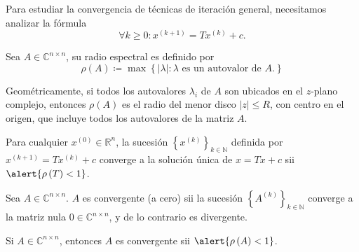 \begin{frame}

	Para estudiar la convergencia de técnicas de iteración general,
	necesitamos analizar la fórmula
	\begin{equation*}
		\boxed{
			\forall k\geq0:
			x^{\left(k+1\right)}=
			Tx^{\left(k\right)}+c.
		}
	\end{equation*}

	\begin{definition}
		Sea $A\in\mathbb{C}^{n\times n}$, su \alert{radio espectral} es
		definido por
		\begin{equation*}
			\rho\left(A\right)\coloneqq
			\max
			\left\{
			\left|\lambda\right|\colon
			\lambda\text{ es un autovalor de }A.
			\right\}
		\end{equation*}

		Geométricamente, si todos los autovalores $\lambda_{i}$ de $A$
		son ubicados en el $z$-plano complejo, entonces
		$\rho\left(A\right)$ es el radio del menor disco
		$\left|z\right|\leq R$, con centro en el origen, que incluye
		todos los autovalores de la matriz $A$.
	\end{definition}

	\begin{theorem}
		Para cualquier $x^{\left(0\right)}\in\mathbb{R}^{n}$, la sucesión
		\begin{math}
			{\left\{x^{\left(k\right)}\right\}}_{k\in\mathbb{N}}
		\end{math}
		definida por
		\begin{math}
			x^{\left(k+1\right)}=
			Tx^{\left(k\right)}+
			c
		\end{math}
		converge a la \alert{solución única} de $x=Tx+c$ sii
		\begin{math}
			\alert{
				\rho\left(T\right)<
				1
			}
		\end{math}.
	\end{theorem}

	\begin{definition}
		Sea $A\in\mathbb{C}^{n\times n}$.
		$A$ es \alert{convergente}
		(\alert{a cero}) sii la sucesión
		\begin{math}
			{\left\{A^{\left(k\right)}\right\}}_{k\in\mathbb{N}}
		\end{math}
		converge a la matriz nula $0\in\mathbb{C}^{n\times n}$, y de lo
		contrario es divergente.
	\end{definition}

	\begin{theorem}
		Si $A\in\mathbb{C}^{n\times n}$, entonces $A$ es
		\alert{convergente} sii
		\begin{math}
			\alert{
				\rho\left(A\right)<
				1
			}
		\end{math}.
	\end{theorem}


\end{frame}
